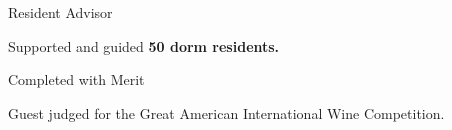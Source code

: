 {
	{Resident Advisor} \hfill{}\newline
}
{
	\item{Supported and guided \textbf{50 dorm residents.}}
}

{Completed with Merit \hfill{}\newline}
{
	\item{Guest judged for the Great American International Wine Competition.}
}

